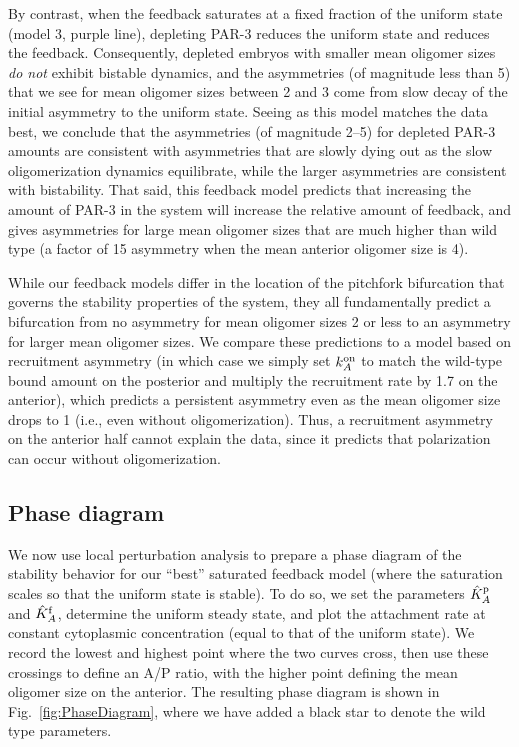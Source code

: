 \documentclass[11pt]{article}
\newcommand{\6}[1]{#1_{\text{6}}}
\newcommand{\3}[1]{#1_{\text{3}}}
\begin{document}
By contrast, when the feedback saturates at a fixed fraction of the uniform state (model 3, purple line), depleting PAR-3 reduces the uniform state and reduces the feedback. Consequently, depleted embryos with smaller mean oligomer sizes \emph{do not} exhibit bistable dynamics, and the asymmetries (of magnitude less than 5) that we see for mean oligomer sizes between 2 and 3 come from slow decay of the initial asymmetry to the uniform state. Seeing as this model matches the data best, we conclude that the asymmetries (of magnitude 2--5) for depleted PAR-3 amounts are consistent with asymmetries that are slowly dying out as the slow oligomerization dynamics equilibrate, while the larger asymmetries are consistent with bistability. That said, this feedback model predicts that increasing the amount of PAR-3 in the system will increase the relative amount of feedback, and gives asymmetries for large mean oligomer sizes that are much higher than wild type (a factor of 15 asymmetry when the mean anterior oligomer size is 4). 

While our feedback models differ in the location of the pitchfork bifurcation that governs the stability properties of the system, they all fundamentally predict a bifurcation from no asymmetry for mean oligomer sizes 2 or less to an asymmetry for larger mean oligomer sizes. We compare these predictions to a model based on recruitment asymmetry (in which case we simply set $k^\text{on}_A$ to match the wild-type bound amount on the posterior and multiply the recruitment rate by 1.7 on the anterior), which predicts a persistent asymmetry even as the mean oligomer size drops to 1 (i.e., even without oligomerization). Thus, a recruitment asymmetry on the anterior half cannot explain the data, since it predicts that polarization can occur without oligomerization. 


\subsection{Phase diagram}
We now use local perturbation analysis to prepare a phase diagram of the stability behavior for our ``best'' saturated feedback model (where the saturation scales so that the uniform state is stable). To do so, we set the parameters $\hat{K}^\text{p}_A$ and $\hat{K}^\text{f}_A$, determine the uniform steady state, and plot the attachment rate at constant cytoplasmic concentration (equal to that of the uniform state). We record the lowest and highest point where the two curves cross, then use these crossings to define an A/P ratio, with the higher point defining the mean oligomer size on the anterior. The resulting phase diagram is shown in Fig.\ \ref{fig:PhaseDiagram}, where we have added a black star to denote the wild type parameters.
\end{document}
